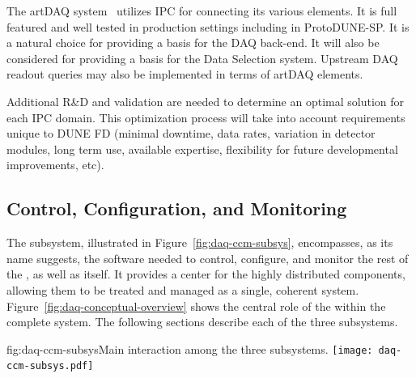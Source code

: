 The artDAQ system~\cite{artdaq} utilizes IPC for connecting its various elements.  It is full featured and well tested in production settings including in ProtoDUNE-SP.  It is a natural choice for providing a basis for the DAQ back-end.  It will also be considered for providing a basis for the Data Selection system.  Upstream DAQ readout queries may also be implemented in terms of artDAQ elements.

Additional R\&D and validation are needed to determine an optimal solution for each IPC domain.  This optimization process will take into account requirements unique to DUNE FD (minimal downtime, data rates, variation in detector modules, long term use, available expertise, flexibility for future developmental improvements, etc).

\subsection{Control, Configuration, and Monitoring}
\label{sec:fd-daq:design-run-control}


The  subsystem, illustrated in Figure~\ref{fig:daq-ccm-subsys}, encompasses, as its name suggests, the software needed to control, configure, and monitor the rest of the , as well as itself. 
It provides a center for the highly distributed  components, allowing them to be treated and managed as a single, coherent system. 
Figure~\ref{fig:daq-conceptual-overview} shows the central role of the  within the complete  system.
The following sections describe each of the three  subsystems. 

\begin{dunefigure}{fig:daq-ccm-subsys}{Main interaction among the three  subsystems.}
  \texttt{[image: daq-ccm-subsys.pdf]}
\end{dunefigure}

